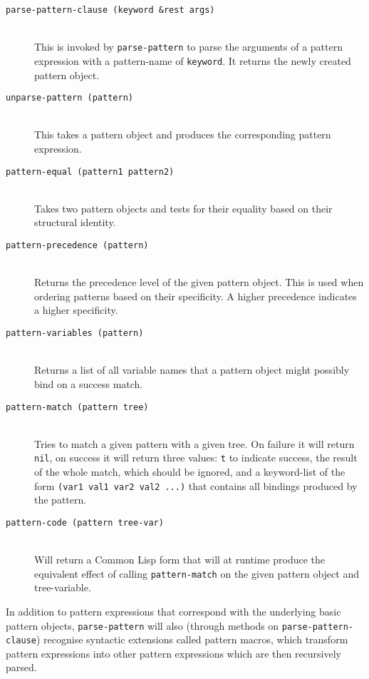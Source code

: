 \documentclass[a4paper,11pt]{scrartcl}
\begin{document}
\begin{description}
\item[\texttt{parse-pattern-clause (keyword \&rest args)}]\hspace{2cm}\\
  This is invoked by \texttt{parse-pattern} to parse the arguments of
  a pattern expression with a pattern-name of \texttt{keyword}.  It
  returns the newly created pattern object.
\item[\texttt{unparse-pattern (pattern)}]\hspace{2cm}\\
  This takes a pattern object and produces the corresponding pattern
  expression.
\item[\texttt{pattern-equal (pattern1 pattern2)}]\hspace{2cm}\\
  Takes two pattern objects and tests for their equality based on
  their structural identity.
\item[\texttt{pattern-precedence (pattern)}]\hspace{2cm}\\
  Returns the precedence level of the given pattern object. This is
  used when ordering patterns based on their specificity.  A higher
  precedence indicates a higher specificity.
\item[\texttt{pattern-variables (pattern)}]\hspace{2cm}\\
  Returns a list of all variable names that a pattern object might
  possibly bind on a success match.
\item[\texttt{pattern-match (pattern tree)}]\hspace{2cm}\\
  Tries to match a given pattern with a given tree.  On failure it
  will return \texttt{nil}, on success it will return three values:
  \texttt{t} to indicate success, the result of the whole match, which
  should be ignored, and a keyword-list of the form \texttt{(var1 val1
    var2 val2 ...)} that contains all bindings produced by the pattern.
\item[\texttt{pattern-code (pattern tree-var)}]\hspace{2cm}\\
  Will return a Common Lisp form that will at runtime produce the
  equivalent effect of calling \texttt{pattern-match} on the given
  pattern object and tree-variable.
\end{description}

In addition to pattern expressions that correspond with the underlying
basic pattern objects, \texttt{parse-pattern} will also (through
methods on \texttt{parse-pattern-clause}) recognise syntactic
extensions called pattern macros, which transform pattern expressions
into other pattern expressions which are then recursively parsed.
\end{document}
